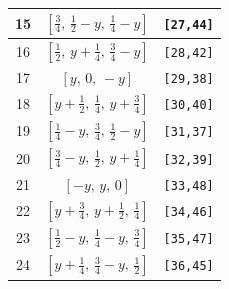 \documentclass[fleqn,8pt]{jsarticle}
\begin{document}
\begin{longtable}{ccc}
15 & $\left[ \frac{3}{4},\, \frac{1}{2} - y,\, \frac{1}{4} - y \right]$ & {\tt [27,44]} \\ \hline
16 & $\left[ \frac{1}{2},\, y + \frac{1}{4},\, \frac{3}{4} - y \right]$ & {\tt [28,42]} \\ \hline
17 & $\left[ y,\, 0,\, - y \right]$ & {\tt [29,38]} \\ \hline
18 & $\left[ y + \frac{1}{2},\, \frac{1}{4},\, y + \frac{3}{4} \right]$ & {\tt [30,40]} \\ \hline
19 & $\left[ \frac{1}{4} - y,\, \frac{3}{4},\, \frac{1}{2} - y \right]$ & {\tt [31,37]} \\ \hline
20 & $\left[ \frac{3}{4} - y,\, \frac{1}{2},\, y + \frac{1}{4} \right]$ & {\tt [32,39]} \\ \hline
21 & $\left[ - y,\, y,\, 0 \right]$ & {\tt [33,48]} \\ \hline
22 & $\left[ y + \frac{3}{4},\, y + \frac{1}{2},\, \frac{1}{4} \right]$ & {\tt [34,46]} \\ \hline
23 & $\left[ \frac{1}{2} - y,\, \frac{1}{4} - y,\, \frac{3}{4} \right]$ & {\tt [35,47]} \\ \hline
24 & $\left[ y + \frac{1}{4},\, \frac{3}{4} - y,\, \frac{1}{2} \right]$ & {\tt [36,45]} \\
\end{longtable}
\renewcommand{\arraystretch}{1.2}
\end{document}
